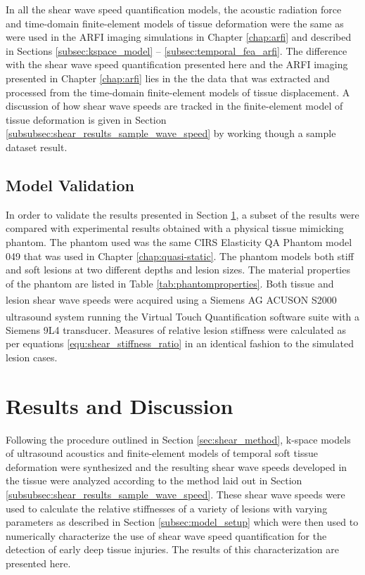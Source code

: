 			In all the shear wave speed quantification models, the acoustic radiation force and time-domain finite-element models of tissue deformation were the same as were used in the ARFI imaging simulations in Chapter \ref{chap:arfi} and described in Sections \ref{subsec:kspace_model} -- \ref{subsec:temporal_fea_arfi}. The difference with the shear wave speed quantification presented here and the ARFI imaging presented in Chapter \ref{chap:arfi} lies in the the data that was extracted and processed from the time-domain finite-element models of tissue displacement. A discussion of how shear wave speeds are tracked in the finite-element model of tissue deformation is given in Section \ref{subsubsec:shear_results_sample_wave_speed} by working though a sample dataset result.

		\subsection{Model Validation}
		\label{subsec:shear_model_validation}
			In order to validate the results presented in Section \ref{subsec:shear_results}, a subset of the results were compared with experimental results obtained with a physical tissue mimicking phantom. The phantom used was the same CIRS Elasticity QA Phantom model 049 that was used in Chapter \ref{chap:quasi-static}. The phantom models both stiff and soft lesions at two different depths and lesion sizes. The material properties of the phantom are listed in Table \ref{tab:phantomproperties}. Both tissue and lesion shear wave speeds were acquired using a Siemens AG ACUSON S2000\textsuperscript{\texttrademark} ultrasound system running the Virtual Touch\textsuperscript{\texttrademark} Quantification software suite with a Siemens 9L4 transducer. Measures of relative lesion stiffness were calculated as per equations \ref{equ:shear_stiffness_ratio} in an identical fashion to the simulated lesion cases.

	\section{Results and Discussion}
	\label{subsec:shear_results}
		Following the procedure outlined in Section \ref{sec:shear_method}, k-space models of ultrasound acoustics and finite-element models of temporal soft tissue deformation were synthesized and the resulting shear wave speeds developed in the tissue were analyzed according to the method laid out in Section \ref{subsubsec:shear_results_sample_wave_speed}. These shear wave speeds were used to calculate the relative stiffnesses of a variety of lesions with varying parameters as described in Section \ref{subsec:model_setup} which were then used to numerically characterize the use of shear wave speed quantification for the detection of early deep tissue injuries. The results of this characterization are presented here.

